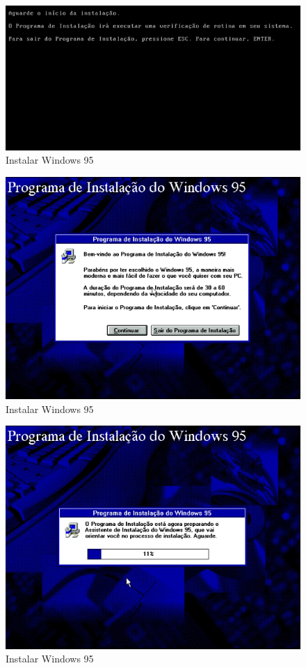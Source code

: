 \documentclass{report}
\begin{document}
\begin{figure}
\centering
\includegraphics[width=\textwidth]{Screenshot_27.png}
\caption{Instalar Windows 95}
\label{fig:27}
\end{figure}

\begin{figure}
\centering
\includegraphics[width=\textwidth]{Screenshot_28.png}
\caption{Instalar Windows 95}
\label{fig:28}
\end{figure}

\begin{figure}
\centering
\includegraphics[width=\textwidth]{Screenshot_29.png}
\caption{Instalar Windows 95}
\label{fig:29}
\end{figure}
\end{document}
